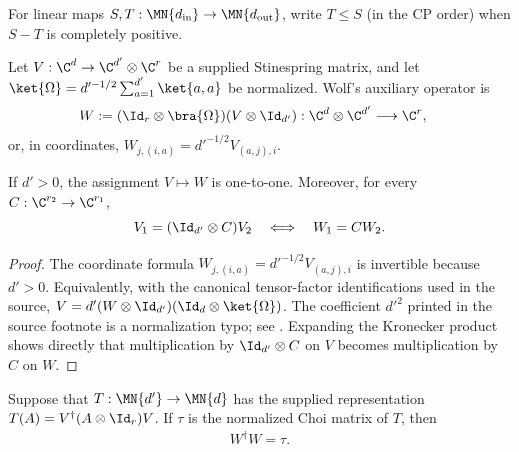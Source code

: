 \begin{definition}\label{def:cp_dominates}
    \leanok
    For linear maps $S,T:\MN{d_{\rm in}}\to\MN{d_{\rm out}}$, write
    $T\le S$ (in the CP order) when $S-T$ is completely positive.
\end{definition}

\begin{definition}\label{def:ordered_cp_stinespring_w}
    \leanok
    Let $V:\C^d\to\C^{d'}\otimes\C^r$ be a supplied Stinespring
    matrix, and let
    $\ket{\Omega}=d'^{-1/2}\sum_{a=1}^{d'}\ket{a,a}$ be normalized.
    Wolf's auxiliary operator is
    \begin{align}
        W
        &:=(\Id_r\otimes\bra{\Omega})(V\otimes\Id_{d'})
          :\C^d\otimes\C^{d'}\longrightarrow\C^r,
        \label{eq:ordered_cp_w_definition}
    \end{align}
    or, in coordinates, $W_{j,(i,a)}=d'^{-1/2}V_{(a,j),i}$.
\end{definition}

\begin{lemma}
    \label{lem:ordered_cp_v_w_correspondence}
    \leanok
    If $d'>0$, the assignment $V\mapsto W$ is one-to-one. Moreover, for
    every $C:\C^{r_2}\to\C^{r_1}$,
    \[
        V_1=(\Id_{d'}\otimes C)V_2
        \quad\Longleftrightarrow\quad
        W_1=CW_2.
    \]
\end{lemma}

\begin{proof}\leanok
    The coordinate formula
    $W_{j,(i,a)}=d'^{-1/2}V_{(a,j),i}$ is invertible because $d'>0$.
    Equivalently, with the canonical tensor-factor identifications used in
    the source,
    $V=d'(W\otimes\Id_{d'})(\Id_d\otimes\ket{\Omega})$.
    The coefficient $d'^2$ printed in the source footnote is a normalization
    typo; see .
    Expanding the Kronecker product shows directly that multiplication by
    $\Id_{d'}\otimes C$ on $V$ becomes multiplication by $C$ on $W$.
\end{proof}

\begin{lemma}
    \label{lem:ordered_cp_stinespring_w_gram}
    \leanok
    Suppose that $T:\MN{d'}\to\MN{d}$ has the supplied representation
    $T(A)=V^\dagger(A\otimes\Id_r)V$. If $\tau$ is the normalized Choi
    matrix of $T$, then
    \begin{align}
        W^\dagger W=\tau.
        \label{eq:ordered_cp_w_gram}
    \end{align}
\end{lemma}

